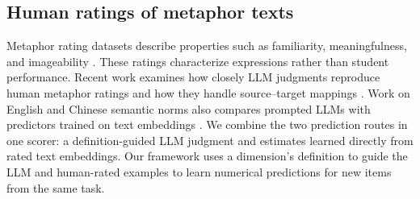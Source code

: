 \subsection{Human ratings of metaphor texts}

Metaphor rating datasets describe properties such as familiarity, meaningfulness, and imageability \citep{huang2024cogmed,wang2022normed}. These ratings characterize expressions rather than student performance. Recent work examines how closely LLM judgments reproduce human metaphor ratings and how they handle source--target mappings \citep{mangiaterra2025gptnorms,pissani2026llmnorms,zhou2026tastingemotions}. Work on English and Chinese semantic norms also compares prompted LLMs with predictors trained on text embeddings \citep{peng2025multilingualnorms}. We combine the two prediction routes in one scorer: a definition-guided LLM judgment and estimates learned directly from rated text embeddings. Our framework uses a dimension's definition to guide the LLM and human-rated examples to learn numerical predictions for new items from the same task.
